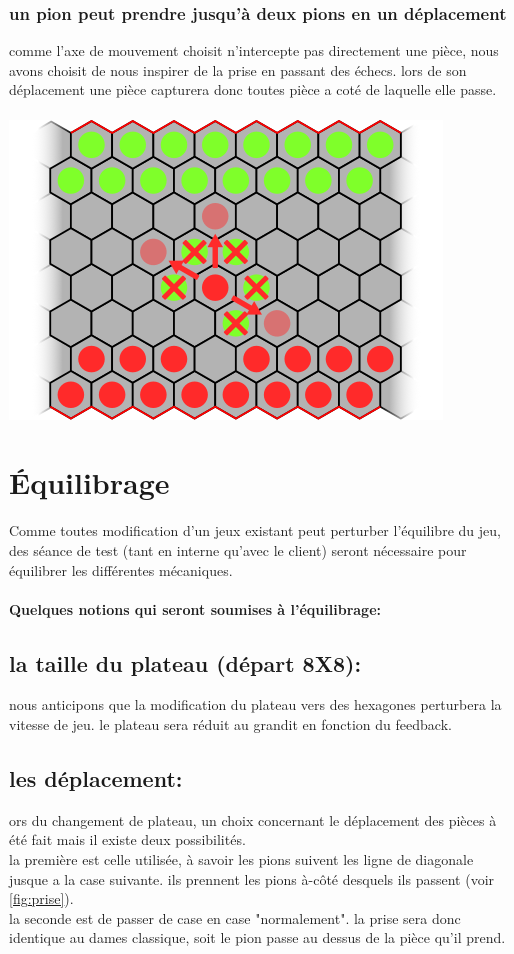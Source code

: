 \documentclass{article}
\begin{document}
\subsubsection{un pion peut prendre jusqu'à deux pions en un déplacement}
comme l'axe de mouvement choisit n'intercepte pas directement une pièce, nous avons choisit de nous inspirer de la prise en passant des échecs. lors de son déplacement une pièce capturera donc toutes pièce a coté de laquelle elle passe.\\\\
\includegraphics[]{images/prise.png}\label{fig:prise}

\section{Équilibrage}
Comme toutes modification d'un jeux existant peut perturber l'équilibre du jeu, des séance de test (tant en interne qu'avec le client) seront nécessaire pour équilibrer les différentes mécaniques.\\\\
\textbf{Quelques notions qui seront soumises à l'équilibrage:}\\
\subsection{la taille du plateau (départ 8X8):}
nous anticipons que la modification du plateau vers des hexagones perturbera la vitesse de jeu. le plateau sera réduit au grandit en fonction du feedback.
\subsection{les déplacement:}
ors du changement de plateau, un choix concernant le déplacement des pièces à été fait mais il existe deux possibilités.\\
la première est celle utilisée, à savoir les pions suivent les ligne de diagonale jusque a la case suivante. ils prennent les pions à-côté desquels ils passent (voir \ref{fig:prise}).\\
la seconde est de passer de case en case "normalement". la prise sera donc identique au dames classique, soit le pion passe au dessus de la pièce qu'il prend.
\newpage
\end{document}
